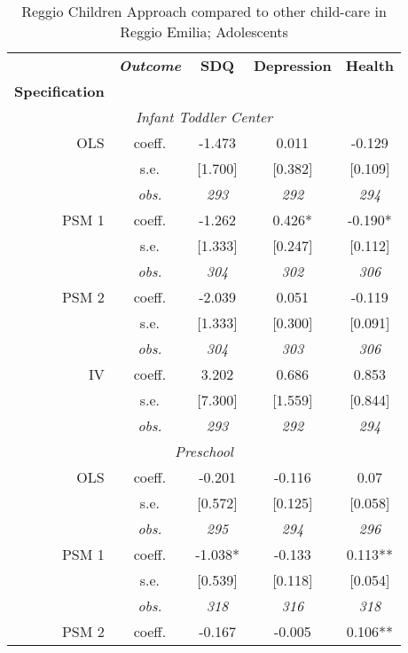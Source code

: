 \begin{table}[H] 
\caption{Reggio Children Approach compared to other child-care in Reggio Emilia; Adolescents}
\label{tab:resultsAdo-reggio}
 \begin{centering} 
\vspace{1ex}
\begin{tabular}{ r c ccc} 
\hline \hline 
 & \textbf{\textit{Outcome}} & \textbf{SDQ}  & \textbf{Depression} & \textbf{Health}  \\ 
\textbf{Specification}  &  &  &  &  \\ 
\hline 
\multicolumn{5}{c}{\textit{Infant Toddler Center }} \\ 
\hline 

OLS	 & coeff.	 & -1.473	 & 0.011	 & -0.129	\\
	 & s.e.	 & [1.700]	 & [0.382]	 & [0.109]	\\
	 & \textit{obs.}	 & \textit{293}	 & \textit{292}	 & \textit{294}	\\
PSM 1	 & coeff.	 & -1.262	 & 0.426*	 & -0.190*	\\
	 & s.e.	 & [1.333]	 & [0.247]	 & [0.112]	\\
	 & \textit{obs.}	 & \textit{304}	 & \textit{302}	 & \textit{306}	\\
PSM 2	 & coeff.	 & -2.039	 & 0.051	 & -0.119	\\
	 & s.e.	 & [1.333]	 & [0.300]	 & [0.091]	\\
	 & \textit{obs.}	 & \textit{304}	 & \textit{303}	 & \textit{306}	\\
IV	 & coeff.	 & 3.202	 & 0.686	 & 0.853	\\
	 & s.e.	 & [7.300]	 & [1.559]	 & [0.844]	\\
	 & \textit{obs.}	 & \textit{293}	 & \textit{292}	 & \textit{294}	\\
\hline \multicolumn{5}{c}{\textit{Preschool }} \\ \hline
OLS	 & coeff.	 & -0.201	 & -0.116	 & 0.07	\\
	 & s.e.	 & [0.572]	 & [0.125]	 & [0.058]	\\
	 & \textit{obs.}	 & \textit{295}	 & \textit{294}	 & \textit{296}	\\
PSM 1	 & coeff.	 & -1.038*	 & -0.133	 & 0.113**	\\
	 & s.e.	 & [0.539]	 & [0.118]	 & [0.054]	\\
	 & \textit{obs.}	 & \textit{318}	 & \textit{316}	 & \textit{318}	\\
PSM 2	 & coeff.	 & -0.167	 & -0.005	 & 0.106**	\\

\end{tabular}
\end{centering}
\end{table}
